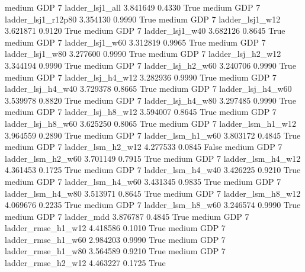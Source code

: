     medium      GDP                 7        ladder_lsj1_all   3.841649      0.4330    True
    medium      GDP                 7     ladder_lsj1_r12p80   3.354130      0.9990    True
    medium      GDP                 7        ladder_lsj1_w12   3.621871      0.9120    True
    medium      GDP                 7        ladder_lsj1_w40   3.682126      0.8645    True
    medium      GDP                 7        ladder_lsj1_w60   3.312819      0.9965    True
    medium      GDP                 7        ladder_lsj1_w80   3.277600      0.9990    True
    medium      GDP                 7      ladder_lsj_h2_w12   3.344194      0.9990    True
    medium      GDP                 7      ladder_lsj_h2_w60   3.240706      0.9990    True
    medium      GDP                 7      ladder_lsj_h4_w12   3.282936      0.9990    True
    medium      GDP                 7      ladder_lsj_h4_w40   3.729378      0.8665    True
    medium      GDP                 7      ladder_lsj_h4_w60   3.539978      0.8820    True
    medium      GDP                 7      ladder_lsj_h4_w80   3.297485      0.9990    True
    medium      GDP                 7      ladder_lsj_h8_w12   3.594007      0.8645    True
    medium      GDP                 7      ladder_lsj_h8_w60   3.625250      0.8065    True
    medium      GDP                 7      ladder_lsm_h1_w12   3.964559      0.2890    True
    medium      GDP                 7      ladder_lsm_h1_w60   3.803172      0.4845    True
    medium      GDP                 7      ladder_lsm_h2_w12   4.277533      0.0845   False
    medium      GDP                 7      ladder_lsm_h2_w60   3.701149      0.7915    True
    medium      GDP                 7      ladder_lsm_h4_w12   4.361453      0.1725    True
    medium      GDP                 7      ladder_lsm_h4_w40   3.426225      0.9210    True
    medium      GDP                 7      ladder_lsm_h4_w60   3.431345      0.9835    True
    medium      GDP                 7      ladder_lsm_h4_w80   3.513971      0.8645    True
    medium      GDP                 7      ladder_lsm_h8_w12   4.069676      0.2235    True
    medium      GDP                 7      ladder_lsm_h8_w60   3.246574      0.9990    True
    medium      GDP                 7             ladder_mdd   3.876787      0.4845    True
    medium      GDP                 7     ladder_rmse_h1_w12   4.418586      0.1010    True
    medium      GDP                 7     ladder_rmse_h1_w60   2.984203      0.9990    True
    medium      GDP                 7     ladder_rmse_h1_w80   3.564589      0.9210    True
    medium      GDP                 7     ladder_rmse_h2_w12   4.463227      0.1725    True
